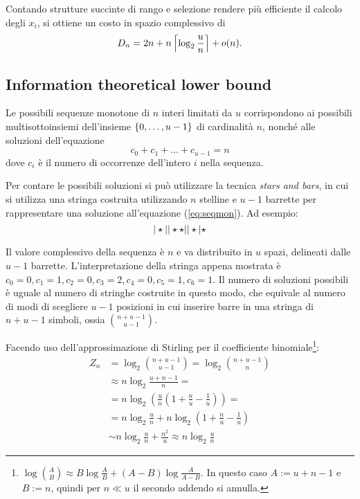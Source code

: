 Contando strutture succinte di rango e selezione rendere più efficiente il calcolo degli $x_i$, si ottiene un costo in spazio complessivo di
\begin{equation*}
	D_n = 2n+n\left\lceil \log_2\frac un \right\rceil+o(n) \text.
\end{equation*}


\subsection{Information theoretical lower bound}
Le possibili sequenze monotone di $n$ interi limitati da $u$ corrispondono ai possibili multisottoinsiemi dell'insieme $\left\{ 0,\dots,u-1 \right\}$ di cardinalità $n$, nonché alle soluzioni dell'equazione
\begin{equation}\label{eq:seqmon}
	c_0+c_1+\dots+c_{u-1} = n
\end{equation}
dove $c_i$ è il numero di occorrenze dell'intero $i$ nella sequenza.

Per contare le possibili soluzioni si può utilizzare la tecnica \textit{stars and bars}, in
cui si utilizza una stringa costruita utilizzando $n$ stelline e $u-1$ barrette per rappresentare una soluzione all'equazione (\ref{eq:seqmon}). Ad esempio:
\begin{equation*}
	| \starsymb || \starsymb \starsymb || \starsymb | \starsymb
\end{equation*}

Il valore complessivo della sequenza è $n$ e va distribuito in $u$ spazi, delineati dalle $u-1$ barrette.
L'interpretazione della stringa appena mostrata è $ c_0 = 0, c_1 = 1, c_2 = 0, c_3 = 2, c_4 = 0, c_5 = 1, c_6 = 1 $.
Il numero di soluzioni possibili è uguale al numero di stringhe costruite in questo modo, che equivale al numero di modi di scegliere $u-1$ posizioni in cui inserire barre in una stringa di $n+u-1$ simboli, ossia $\binom{n+u-1}{u - 1}$.

Facendo uso dell'approssimazione di Stirling per il coefficiente binomiale\footnote{$\log\binom AB \approx B\log\frac AB+(A-B)\log\frac{A}{A-B}$. In questo caso $A:=u+n-1$ e $B:=n$, quindi per $n\ll u$ il secondo addendo si annulla.}:
\begin{align*}
	Z_n & = \log_2\binom{n+u-1}{u - 1} = \log_2\binom{n+u-1}{n}              \\
	    & \approx n\log_2\frac{u+n-1}{n} =                                   \\
	    & = n\log_2\left(\frac un\left(1+\frac nu - \frac 1u\right)\right) = \\
	    & = n\log_2\frac un + n\log_2\left(1+\frac nu-\frac 1u\right)        \\
	    & \sim n\log_2\frac un + \frac{n^2}{u} \approx n\log_2\frac un
\end{align*}

